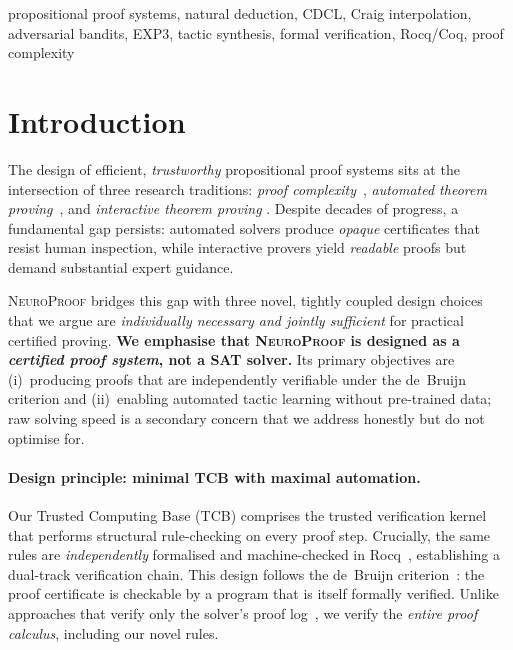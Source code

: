 \documentclass[conference]{IEEEtran}
\newcommand{\NP}{\textsc{NeuroProof}}
\newcommand{\TCB}{\textnormal{TCB}}
\begin{document}
\begin{IEEEkeywords}
propositional proof systems, natural deduction, CDCL, Craig interpolation,
adversarial bandits, EXP3, tactic synthesis, formal verification, Rocq/Coq,
proof complexity
\end{IEEEkeywords}

\section{Introduction}
\label{sec:intro}

The design of efficient, \emph{trustworthy} propositional proof systems
sits at the intersection of three research traditions:
\emph{proof complexity}~\cite{CookReckhow1979,Ben-Sasson2001},
\emph{automated theorem proving}~\cite{Davis1962,Robinson1965}, and
\emph{interactive theorem proving}
\cite{CoqDevelopmentTeam2024,MouraKong2021}.
Despite decades of progress, a fundamental gap persists: automated
solvers produce \emph{opaque} certificates that resist human inspection,
while interactive provers yield \emph{readable} proofs but demand
substantial expert guidance.

\NP{} bridges this gap with three novel, tightly coupled design choices
that we argue are \emph{individually necessary and jointly sufficient}
for practical certified proving.  \textbf{We emphasise that \NP{} is
designed as a \emph{certified proof system}, not a SAT solver.}  Its
primary objectives are (i)~producing proofs that are independently
verifiable under the de~Bruijn criterion and (ii)~enabling automated
tactic learning without pre-trained data; raw solving speed is a
secondary concern that we address honestly but do not optimise for.

\paragraph{Design principle: minimal \TCB{} with maximal automation.}
Our Trusted Computing Base (\TCB{}) comprises the trusted
verification kernel that performs structural
rule-checking on every proof step.  Crucially, the same rules are
\emph{independently} formalised and machine-checked in
Rocq~\cite{CoqDevelopmentTeam2024}, establishing a
dual-track verification chain.  This design follows the de~Bruijn
criterion~\cite{Harrison2009}: the proof certificate is checkable by
a program that is itself formally verified.  Unlike approaches that
verify only the solver's proof log~\cite{HeuleHuntMahmoud2017}, we
verify the \emph{entire proof calculus}, including our novel rules.
\end{document}

